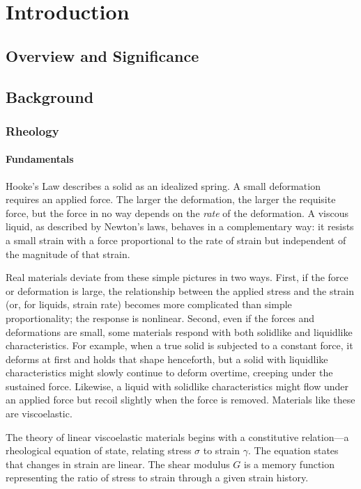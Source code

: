 \chapter{Introduction}

\section{Overview and Significance}

\section{Background}

\subsection{Rheology}

\subsubsection{Fundamentals}

Hooke's Law describes a solid as an idealized spring. A small deformation requires an applied force. The larger the deformation, the larger the requisite force, but the force in no way depends on the \emph{rate} of the deformation. A viscous liquid, as described by Newton's laws, behaves in a complementary way: it resists a small strain with a force proportional to the rate of strain but independent of the magnitude of that strain.

Real materials deviate from these simple pictures in two ways. First, if the force or deformation is large, the relationship between the applied stress and the strain (or, for liquids, strain rate) becomes more complicated than simple proportionality; the response is nonlinear. Second, even if the forces and deformations are small, some materials respond with both solidlike and liquidlike characteristics. For example, when a true solid is subjected to a constant force, it deforms at first and holds that shape henceforth, but a solid with liquidlike characteristics might slowly continue to deform overtime, creeping under the sustained force. Likewise, a liquid with solidlike characteristics might flow under an applied force but recoil slightly when the force is removed. Materials like these are viscoelastic.\cite{Ferry1980}

The theory of linear viscoelastic materials begins with a constitutive relation---a rheological equation of state, relating stress $\sigma$ to strain $\gamma$. The equation states that changes in strain are linear. The shear modulus $G$ is a memory function representing the ratio of stress to strain through a given strain history.

